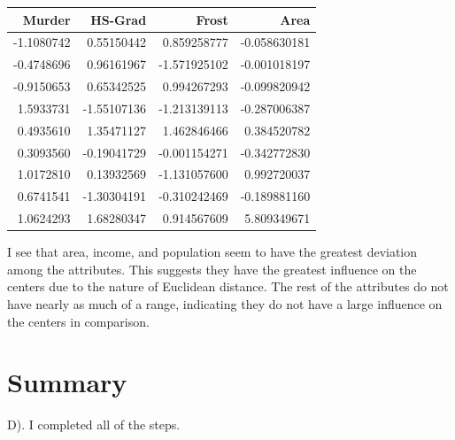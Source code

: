 \documentclass[11pt]{article}
\begin{document}
\begin{center}
\begin{tabular}{rrrr}
Murder & HS-Grad & Frost & Area\\
\hline
-1.1080742 & 0.55150442 & 0.859258777 & -0.058630181\\
-0.4748696 & 0.96161967 & -1.571925102 & -0.001018197\\
-0.9150653 & 0.65342525 & 0.994267293 & -0.099820942\\
1.5933731 & -1.55107136 & -1.213139113 & -0.287006387\\
0.4935610 & 1.35471127 & 1.462846466 & 0.384520782\\
0.3093560 & -0.19041729 & -0.001154271 & -0.342772830\\
1.0172810 & 0.13932569 & -1.131057600 & 0.992720037\\
0.6741541 & -1.30304191 & -0.310242469 & -0.189881160\\
1.0624293 & 1.68280347 & 0.914567609 & 5.809349671\\
\end{tabular}
\end{center}

I see that area, income, and population seem to have the greatest deviation among the
attributes. This suggests they have the greatest influence on the centers due
to the nature of Euclidean distance. The rest of the attributes do not have
nearly as much of a range, indicating they do not have a large influence on
the centers in comparison.

\section*{Summary}
\label{sec:orga7ca44c}
D). I completed all of the steps.
\end{document}
